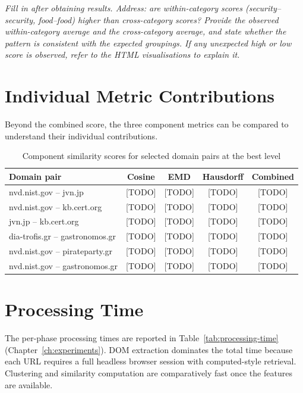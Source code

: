 \textit{Fill in after obtaining results. Address: are within-category scores (security--security, food--food) higher than cross-category scores? Provide the observed within-category average and the cross-category average, and state whether the pattern is consistent with the expected groupings. If any unexpected high or low score is observed, refer to the HTML visualisations to explain it.}

\section{Individual Metric Contributions}
\label{sec:individual-metrics}

Beyond the combined score, the three component metrics can be compared to understand their individual contributions.

\begin{table}[htbp]
\centering
\caption{Component similarity scores for selected domain pairs at the best level}
\label{tab:component-metrics}
\begin{tabular}{lcccc}
\toprule
\textbf{Domain pair} & \textbf{Cosine} & \textbf{EMD} & \textbf{Hausdorff} & \textbf{Combined} \\
\midrule
nvd.nist.gov -- jvn.jp         & [TODO] & [TODO] & [TODO] & [TODO] \\
nvd.nist.gov -- kb.cert.org    & [TODO] & [TODO] & [TODO] & [TODO] \\
jvn.jp -- kb.cert.org          & [TODO] & [TODO] & [TODO] & [TODO] \\
dia-trofis.gr -- gastronomos.gr & [TODO] & [TODO] & [TODO] & [TODO] \\
nvd.nist.gov -- pirateparty.gr & [TODO] & [TODO] & [TODO] & [TODO] \\
nvd.nist.gov -- gastronomos.gr & [TODO] & [TODO] & [TODO] & [TODO] \\
\bottomrule
\end{tabular}
\end{table}

\section{Processing Time}
\label{sec:processing-results}

The per-phase processing times are reported in Table~\ref{tab:processing-time} (Chapter~\ref{ch:experiments}). DOM extraction dominates the total time because each URL requires a full headless browser session with computed-style retrieval. Clustering and similarity computation are comparatively fast once the features are available.

